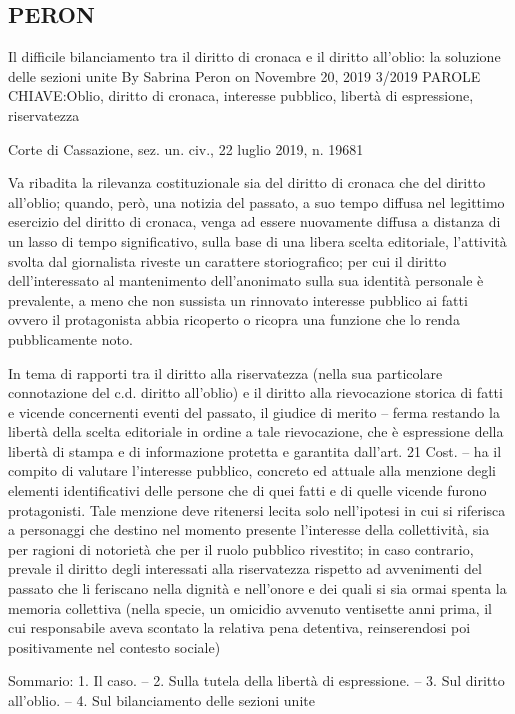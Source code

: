 \subsection{PERON}
 Il difficile bilanciamento tra il diritto di cronaca e il diritto all’oblio: la soluzione delle sezioni unite
By Sabrina Peron on Novembre 20, 2019 3/2019
PAROLE CHIAVE:Oblio, diritto di cronaca, interesse pubblico, libertà di espressione, riservatezza

Corte di Cassazione, sez. un. civ., 22 luglio 2019, n. 19681

Va ribadita la rilevanza costituzionale sia del diritto di cronaca che del diritto all’oblio; quando, però, una notizia del passato, a suo tempo diffusa nel legittimo esercizio del diritto di cronaca, venga ad essere nuovamente diffusa a distanza di un lasso di tempo significativo, sulla base di una libera scelta editoriale, l’attività svolta dal giornalista riveste un carattere storiografico; per cui il diritto dell’interessato al mantenimento dell’anonimato sulla sua identità personale è prevalente, a meno che non sussista un rinnovato interesse pubblico ai fatti ovvero il protagonista abbia ricoperto o ricopra una funzione che lo renda pubblicamente noto.

In tema di rapporti tra il diritto alla riservatezza (nella sua particolare connotazione del c.d. diritto all’oblio) e il diritto alla rievocazione storica di fatti e vicende concernenti eventi del passato, il giudice di merito – ferma restando la libertà della scelta editoriale in ordine a tale rievocazione, che è espressione della libertà di stampa e di informazione protetta e garantita dall’art. 21 Cost. – ha il compito di valutare l’interesse pubblico, concreto ed attuale alla menzione degli elementi identificativi delle persone che di quei fatti e di quelle vicende furono protagonisti. Tale menzione deve ritenersi lecita solo nell’ipotesi in cui si riferisca a personaggi che destino nel momento presente l’interesse della collettività, sia per ragioni di notorietà che per il ruolo pubblico rivestito; in caso contrario, prevale il diritto degli interessati alla riservatezza rispetto ad avvenimenti del passato che li feriscano nella dignità e nell’onore e dei quali si sia ormai spenta la memoria collettiva (nella specie, un omicidio avvenuto ventisette anni prima, il cui responsabile aveva scontato la relativa pena detentiva, reinserendosi poi positivamente nel contesto sociale)



Sommario: 1. Il caso. – 2. Sulla tutela della libertà di espressione. – 3. Sul diritto all’oblio. – 4. Sul bilanciamento delle sezioni unite



